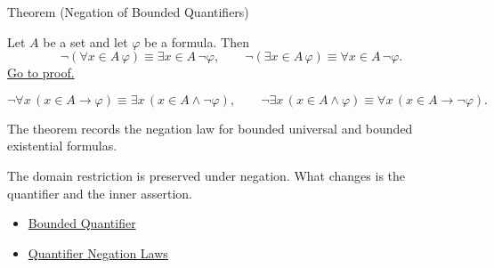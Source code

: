 \begin{theorembox}{Theorem (Negation of Bounded Quantifiers)}
\begin{theorem}
\label{thm:neg-bounded}
Let \(A\) be a set and let \(\varphi\) be a formula. Then
\[
\neg(\forall x\in A\,\varphi)\equiv \exists x\in A\,\neg\varphi,
\qquad
\neg(\exists x\in A\,\varphi)\equiv \forall x\in A\,\neg\varphi.
\]
\hyperref[prf:neg-bounded]{Go to proof.}
\end{theorem}
\end{theorembox}

\begin{remark*}
\[
\neg\forall x\,(x\in A\to\varphi)
\equiv
\exists x\,(x\in A\land\neg\varphi),
\qquad
\neg\exists x\,(x\in A\land\varphi)
\equiv
\forall x\,(x\in A\to\neg\varphi).
\]
\end{remark*}

\begin{remark*}
The theorem records the negation law for bounded universal and bounded
existential formulas.
\end{remark*}

\begin{remark*}[Interpretation]
The domain restriction is preserved under negation. What changes is the
quantifier and the inner assertion.
\end{remark*}

\begin{dependencies}
\begin{itemize}
  \item \hyperref[def:bounded-q]{Bounded Quantifier}
  \item \hyperref[thm:qneg]{Quantifier Negation Laws}
\end{itemize}
\end{dependencies}
